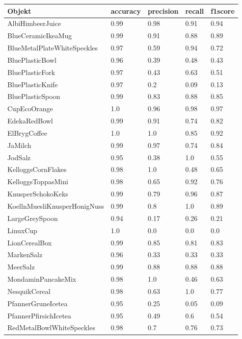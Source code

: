 \begin{table}
\begin{tabularx}{\textwidth}{Xllll}
\textbf{Objekt}	& \textbf{\gls{accuracy}} & \textbf{\gls{precision}}	& \textbf{\gls{recall}}	& \textbf{\gls{f1score}} \\ \hline
AlbiHimbeerJuice & 0.99 & 0.98 & 0.91 & 0.94 \\  
BlueCeramicIkeaMug & 0.99 & 0.91 & 0.88 & 0.89 \\  
BlueMetalPlateWhiteSpeckles & 0.97 & 0.59 & 0.94 & 0.72 \\  
BluePlasticBowl & 0.96 & 0.39 & 0.48 & 0.43 \\  
BluePlasticFork & 0.97 & 0.43 & 0.63 & 0.51 \\  
BluePlasticKnife & 0.97 & 0.2 & 0.09 & 0.13 \\  
BluePlasticSpoon & 0.99 & 0.83 & 0.88 & 0.85 \\  
CupEcoOrange & 1.0 & 0.96 & 0.98 & 0.97 \\  
EdekaRedBowl & 0.99 & 0.91 & 0.74 & 0.82 \\  
ElBrygCoffee & 1.0 & 1.0 & 0.85 & 0.92 \\  
JaMilch & 0.99 & 0.97 & 0.74 & 0.84 \\  
JodSalz & 0.95 & 0.38 & 1.0 & 0.55 \\  
KelloggsCornFlakes & 0.98 & 1.0 & 0.48 & 0.65 \\  
KelloggsToppasMini & 0.98 & 0.65 & 0.92 & 0.76 \\  
KnusperSchokoKeks & 0.99 & 0.79 & 0.96 & 0.87 \\  
KoellnMuesliKnusperHonigNuss & 0.99 & 0.8 & 1.0 & 0.89 \\  
LargeGreySpoon & 0.94 & 0.17 & 0.26 & 0.21 \\  
LinuxCup & 1.0 & 0.0 & 0.0 & 0.0 \\  
LionCerealBox & 0.99 & 0.85 & 0.81 & 0.83 \\  
MarkenSalz & 0.96 & 0.33 & 0.33 & 0.33 \\  
MeerSalz & 0.99 & 0.88 & 0.88 & 0.88 \\  
MondaminPancakeMix & 0.98 & 1.0 & 0.46 & 0.63 \\  
NesquikCereal & 0.98 & 0.63 & 1.0 & 0.77 \\  
PfannerGruneIcetea & 0.95 & 0.25 & 0.05 & 0.09 \\  
PfannerPfirsichIcetea & 0.95 & 0.49 & 0.6 & 0.54 \\  
RedMetalBowlWhiteSpeckles & 0.98 & 0.7 & 0.76 & 0.73 \\  

\end{tabularx}
\end{table}
